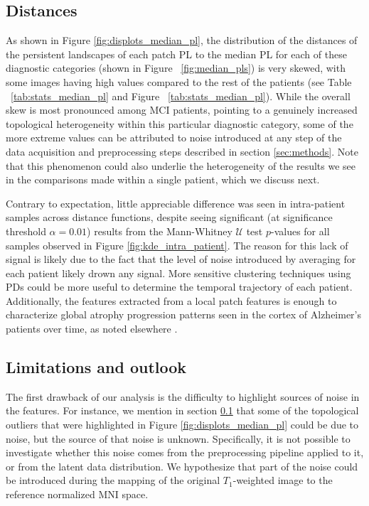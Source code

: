 \documentclass{article}
\begin{document}
\subsection{Distances}\label{sec:disc-dist}

As shown in Figure \ref{fig:displots_median_pl}, the distribution of the distances of the persistent landscapes of each patch PL to the median PL for each of these diagnostic categories (shown in Figure ~\ref{fig:median_pls}) is very skewed, with some images having high values compared to the rest of the patients (see Table ~\ref{tab:stats_median_pl} and Figure ~\ref{tab:stats_median_pl}). While the overall skew is most pronounced among MCI patients, pointing to a genuinely increased topological heterogeneity within this particular diagnostic category, some of the more extreme values can be attributed to noise introduced at any step of the data acquisition and preprocessing steps described in section \ref{sec:methods}. Note that this phenomenon could also underlie the heterogeneity of the results we see in the comparisons made within a single patient, which we discuss next.

Contrary to expectation, little appreciable difference was seen in intra-patient samples across distance functions, despite seeing significant (at significance threshold $\alpha=0.01$) results from the Mann-Whitney $\mathcal{U}$ test $p$-values for all samples observed in Figure \ref{fig:kde_intra_patient}. The reason for this lack of signal is likely due to the fact that the level of noise introduced by averaging for each patient likely drown any signal. More sensitive clustering techniques using PDs could be more useful to determine the temporal trajectory of each patient. Additionally, the features extracted from a local patch features is enough to characterize global atrophy progression patterns seen in the cortex of Alzheimer's patients over time, as noted elsewhere \citep{toniolo2018patterns}.

\subsection{Limitations and outlook}

The first drawback of our analysis is the difficulty to highlight sources of noise in the features. For instance, we mention in section \ref{sec:disc-dist} that some of the topological outliers that were highlighted in Figure \ref{fig:displots_median_pl} could be due to noise, but the source of that noise is unknown. Specifically, it is not possible to investigate whether this noise comes from the preprocessing pipeline applied to it, or from the latent data distribution. We hypothesize that part of the noise could be introduced during the mapping of the original $T_1$-weighted image to the reference normalized MNI space.
\end{document}
